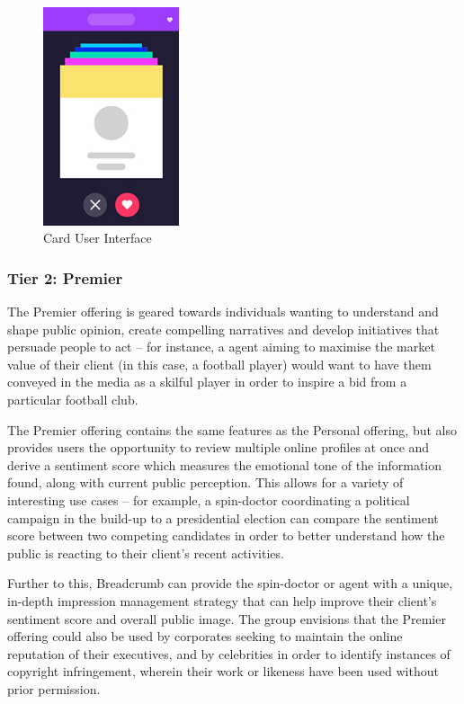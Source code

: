 \begin{figure}
  \centering
  \begin{minipage}{4cm}
    \centering
    \includegraphics[width=4cm]{inc/flip_ui.jpg}
    \caption{Card User Interface}
    \label{fig:flipUI}
  \end{minipage}
\end{figure}

\subsubsection{Tier 2: Premier}

The Premier offering is geared towards individuals wanting to understand and shape public opinion, create compelling narratives and develop initiatives that persuade people to act -- for instance, a agent aiming to maximise the market value of their client (in this case, a football player) would want to have them conveyed in the media as a skilful player in order to inspire a bid from a particular football club.

The Premier offering contains the same features as the Personal offering, but also provides users the opportunity to review multiple online profiles at once and derive a sentiment score which measures the emotional tone of the information found, along with current public perception. This allows for a variety of interesting use cases -- for example, a spin-doctor coordinating a political campaign in the build-up to a presidential election can compare the sentiment score between two competing candidates in order to better understand how the public is reacting to their client’s recent activities.

Further to this, Breadcrumb can provide the spin-doctor or agent with a unique, in-depth impression management strategy that can help improve their client’s sentiment score and overall public image. The group envisions that the Premier offering could also be used by corporates seeking to maintain the online reputation of their executives, and by celebrities in order to identify instances of copyright infringement, wherein their work or likeness have been used without prior permission. 

